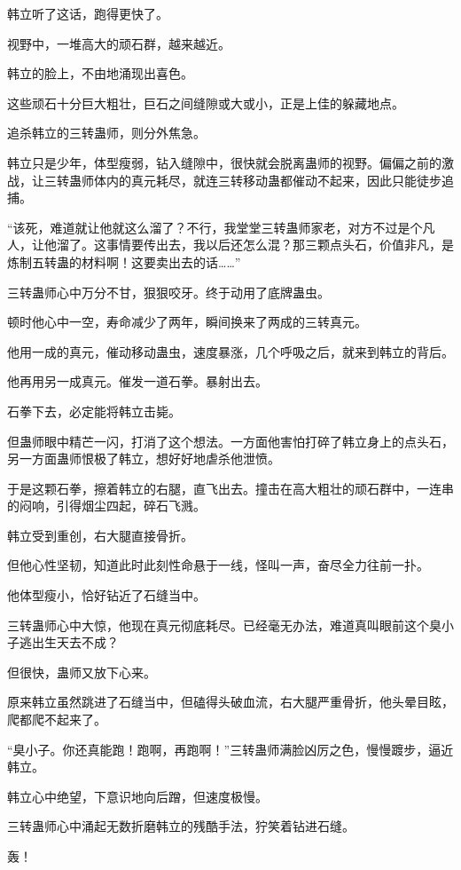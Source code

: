 \begin{this_body}
韩立听了这话，跑得更快了。

视野中，一堆高大的顽石群，越来越近。

韩立的脸上，不由地涌现出喜色。

这些顽石十分巨大粗壮，巨石之间缝隙或大或小，正是上佳的躲藏地点。

追杀韩立的三转蛊师，则分外焦急。

韩立只是少年，体型瘦弱，钻入缝隙中，很快就会脱离蛊师的视野。偏偏之前的激战，让三转蛊师体内的真元耗尽，就连三转移动蛊都催动不起来，因此只能徒步追捕。

“该死，难道就让他就这么溜了？不行，我堂堂三转蛊师家老，对方不过是个凡人，让他溜了。这事情要传出去，我以后还怎么混？那三颗点头石，价值非凡，是炼制五转蛊的材料啊！这要卖出去的话……”

三转蛊师心中万分不甘，狠狠咬牙。终于动用了底牌蛊虫。

顿时他心中一空，寿命减少了两年，瞬间换来了两成的三转真元。

他用一成的真元，催动移动蛊虫，速度暴涨，几个呼吸之后，就来到韩立的背后。

他再用另一成真元。催发一道石拳。暴射出去。

石拳下去，必定能将韩立击毙。

但蛊师眼中精芒一闪，打消了这个想法。一方面他害怕打碎了韩立身上的点头石，另一方面蛊师恨极了韩立，想好好地虐杀他泄愤。

于是这颗石拳，擦着韩立的右腿，直飞出去。撞击在高大粗壮的顽石群中，一连串的闷响，引得烟尘四起，碎石飞溅。

韩立受到重创，右大腿直接骨折。

但他心性坚韧，知道此时此刻性命悬于一线，怪叫一声，奋尽全力往前一扑。

他体型瘦小，恰好钻近了石缝当中。

三转蛊师心中大惊，他现在真元彻底耗尽。已经毫无办法，难道真叫眼前这个臭小子逃出生天去不成？

但很快，蛊师又放下心来。

原来韩立虽然跳进了石缝当中，但磕得头破血流，右大腿严重骨折，他头晕目眩，爬都爬不起来了。

“臭小子。你还真能跑！跑啊，再跑啊！”三转蛊师满脸凶厉之色，慢慢踱步，逼近韩立。

韩立心中绝望，下意识地向后蹭，但速度极慢。

三转蛊师心中涌起无数折磨韩立的残酷手法，狞笑着钻进石缝。

轰！


\end{this_body}
